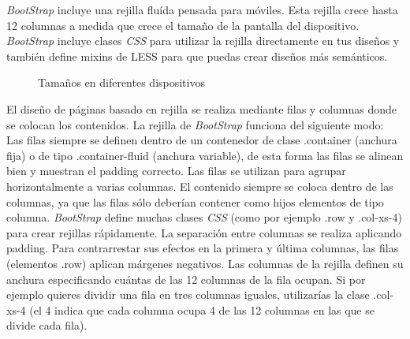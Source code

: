 \documentclass[a4paper, 12pt]{book}
\begin{document}
\textit{BootStrap} incluye una rejilla flu\'ida pensada para m\'oviles. Esta rejilla crece hasta 12 columnas a medida que crece el tama\~no de la pantalla del 
dispositivo. \textit{BootStrap} incluye clases \textit{CSS} para utilizar la rejilla directamente en tus dise\~nos y tambi\'en define mixins de LESS para que puedas 
crear dise\~nos m\'as sem\'anticos.

\begin{figure}[htbp] 
  \label{figura:bootstrap}
  \centering
  \caption{Tama\~nos en diferentes dispositivos}
\end{figure}

El dise\~no de p\'aginas basado en rejilla se realiza mediante filas y columnas donde se colocan los contenidos. La rejilla de \textit{BootStrap} funciona del
siguiente modo: Las filas siempre se definen dentro de un contenedor de clase .container (anchura fija) o de tipo .container-fluid (anchura variable), 
de esta forma las filas se alinean bien y muestran el padding correcto. Las filas se utilizan para agrupar horizontalmente a varias columnas. 
El contenido siempre se coloca dentro de las columnas, ya que las filas s\'olo deber\'ian contener como hijos elementos de tipo columna. \textit{BootStrap} 
define muchas clases \textit{CSS} (como por ejemplo .row y .col-xs-4) para crear rejillas r\'apidamente. La separaci\'on entre columnas se realiza aplicando 
padding. Para contrarrestar sus efectos en la primera y \'ultima columnas, las filas (elementos .row) aplican m\'argenes negativos. Las columnas de la 
rejilla definen su anchura especificando cu\'antas de las 12 columnas de la fila ocupan. Si por ejemplo quieres dividir una fila en tres columnas 
iguales, utilizar\'ias la clase .col-xs-4 (el 4 indica que cada columna ocupa 4 de las 12 columnas en las que se divide cada fila).
\end{document}
